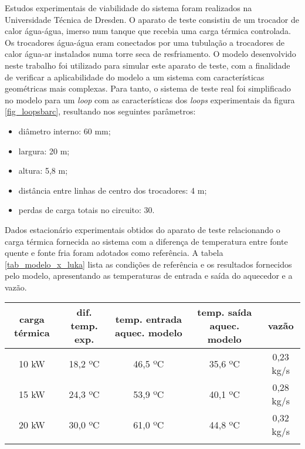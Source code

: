 \documentclass[a4paper,portuguese,10pt]{article}
\begin{document}
Estudos experimentais de viabilidade do sistema foram realizados na Universidade Técnica de Dresden. O aparato de teste consistiu de um trocador de calor água-água, imerso num tanque que recebia uma carga térmica controlada. Os trocadores água-água eram conectados por uma tubulação a trocadores de calor água-ar instalados numa torre seca de resfriamento. O modelo desenvolvido neste trabalho foi utilizado para simular este aparato de teste, com a finalidade de verificar a aplicabilidade do modelo a um sistema com características geométricas mais complexas. Para tanto, o sistema de teste real foi simplificado no modelo para um {\it loop} com as características dos {\it loops} experimentais da figura \ref{fig_loopsbarc}, resultando nos seguintes parâmetros:

\begin{itemize}
\item diâmetro interno: 60 mm;
\item largura: 20 m;
\item altura: 5,8 m;
\item distância entre linhas de centro dos trocadores: 4 m;
\item perdas de carga totais no circuito: 30.
\end{itemize}

Dados estacionário experimentais obtidos do aparato de teste relacionando o carga térmica fornecida ao sistema com a diferença de temperatura entre fonte quente e fonte fria foram adotados como referência. A tabela \ref{tab_modelo_x_luka} lista as condições de referência e os resultados fornecidos pelo modelo, apresentando as temperaturas de entrada e saída do aquecedor e a vazão.

\begin{center}
\begin{tabular}{ccccc}
  \hline
  carga térmica & dif. temp. exp. & temp. entrada aquec. modelo & temp. saída aquec. modelo & vazão\\
  \hline
  10 kW & 18,2 ºC & 46,5 ºC & 35,6 ºC & 0,23 kg/s\\
  15 kW & 24,3 ºC & 53,9 ºC & 40,1 ºC & 0,28 kg/s\\
  20 kW & 30,0 ºC & 61,0 ºC & 44,8 ºC & 0,32 kg/s\\
  \hline\\
\end{tabular}
\label{tab_modelo_x_luka}
\end{center}
\end{document}
